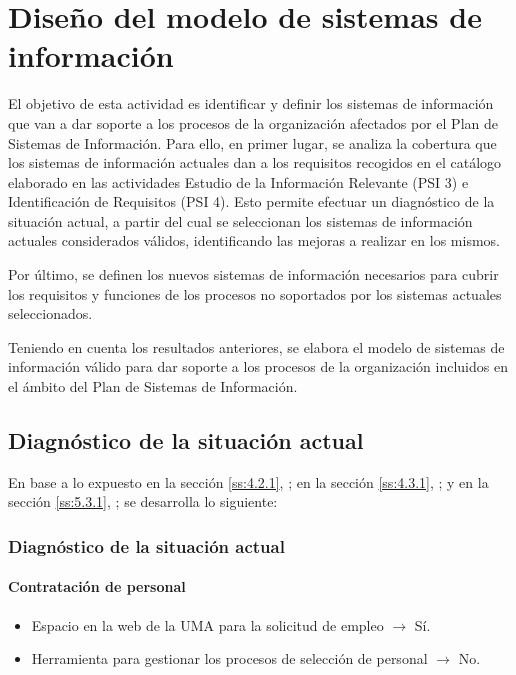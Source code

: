 \documentclass[11pt,a4paper,spanish,twoside]{report}
\begin{document}
\chapter{Diseño del modelo de sistemas de información}
El objetivo de esta actividad es identificar y definir los sistemas de
información que van a dar soporte a los procesos de la organización afectados
por el Plan de Sistemas de Información. Para ello, en primer lugar, se
analiza la cobertura que los sistemas de información actuales dan a los
requisitos recogidos en el catálogo elaborado en las actividades Estudio de
la Información Relevante (PSI 3) e Identificación de Requisitos (PSI 4). Esto
permite efectuar un diagnóstico de la situación actual, a partir del cual
se seleccionan los sistemas de información actuales considerados válidos,
identificando las mejoras a realizar en los mismos. 

Por último, se definen los nuevos sistemas de información necesarios para
cubrir los requisitos y funciones de los procesos no soportados por los
sistemas actuales seleccionados. 

Teniendo en cuenta los resultados anteriores, se elabora el modelo de
sistemas de información válido para dar soporte a los procesos de la
organización incluidos en el ámbito del Plan de Sistemas de Información. 

\section{Diagnóstico de la situación actual}

En base a lo expuesto 
en la sección \vref{ss:4.2.1}, \emph{}; 
en la sección \vref{ss:4.3.1}, \emph{}; y 
en la sección \vref{ss:5.3.1}, \emph{};
se desarrolla lo siguiente:

\subsection{Diagnóstico de la situación actual} \label{ss:6.1.1}
\subsubsection{Contratación de personal}
\begin{itemize}
\item Espacio en la web de la UMA para la solicitud de empleo $\to$ Sí.
\item Herramienta para gestionar los procesos de selección de personal $\to$ No.
\end{itemize}
\end{document}
